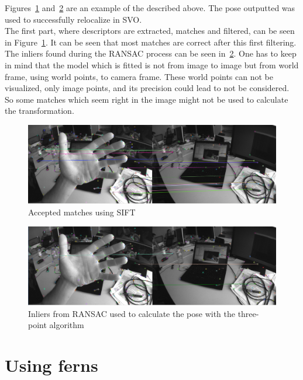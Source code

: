 Figures~\ref{fig:3pt_matches} and~\ref{fig:3pt_inliers} are an example of the described above. The pose outputted was used to successfully relocalize in SVO.\\

The first part, where descriptors are extracted, matches and filtered, can be seen in Figure~\ref{fig:3pt_matches}.  It can be seen that most matches are correct after this first filtering.\\

The inliers found during the RANSAC process can be seen in~\ref{fig:3pt_inliers}. One has to keep in mind that the model which is fitted  is not from image to image but from world frame, using world points, to camera frame. These world points can not be visualized, only image points, and its precision could lead to not be considered. So some matches which seem right in the image might not be used to calculate the transformation.\\

\begin{figure}[htpb]
  \centering
  \includegraphics[width=1.0\linewidth]{img/3pt_matches_1.png}
  \caption{Accepted matches using SIFT}
  \label{fig:3pt_matches}
\end{figure}


\begin{figure}[htpb]
  \centering
  \includegraphics[width=1.0\linewidth]{img/3pt_inliers_1.png}
  \caption{Inliers from RANSAC used to calculate the pose with the three-point algorithm }
  \label{fig:3pt_inliers}
\end{figure}


\section{Using ferns}
\label{sec:using_ferns}

